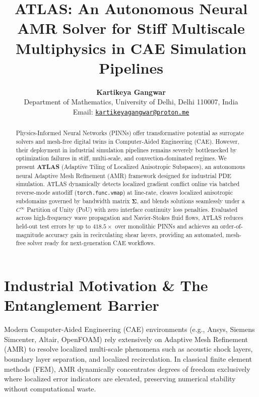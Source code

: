 \documentclass[10pt,a4paper,twocolumn]{article}
\title{\textbf{\Large ATLAS: An Autonomous Neural AMR Solver for Stiff Multiscale Multiphysics in CAE Simulation Pipelines}}
\author{
    \textbf{Kartikeya Gangwar} \\
    \small Department of Mathematics, University of Delhi, Delhi 110007, India \\
    \small Email: \href{mailto:kartikeyagangwar@proton.me}{\texttt{kartikeyagangwar@proton.me}}
}
\date{}
\begin{document}
\maketitle
\thispagestyle{empty}
\pagestyle{empty}

\begin{abstract}
\noindent Physics-Informed Neural Networks (PINNs) offer transformative potential as surrogate solvers and mesh-free digital twins in Computer-Aided Engineering (CAE). However, their deployment in industrial simulation pipelines remains severely bottlenecked by optimization failures in stiff, multi-scale, and convection-dominated regimes. We present \textbf{ATLAS} (Adaptive Tiling of Localized Anisotropic Subspaces), an autonomous neural Adaptive Mesh Refinement (AMR) framework designed for industrial PDE simulation. ATLAS dynamically detects localized gradient conflict online via batched reverse-mode autodiff (\texttt{torch.func.vmap}) at line-rate, cleaves localized anisotropic subdomains governed by bandwidth matrix $\boldsymbol{\Sigma}$, and blends solutions seamlessly under a $C^\infty$ Partition of Unity (PoU) with zero interface continuity loss penalties. Evaluated across high-frequency wave propagation and Navier-Stokes fluid flows, ATLAS reduces held-out test errors by up to $418.5\times$ over monolithic PINNs and achieves an order-of-magnitude accuracy gain in recirculating shear layers, providing an automated, mesh-free solver ready for next-generation CAE workflows.
\end{abstract}

\vspace{-0.2cm}
\section{Industrial Motivation \& The Entanglement Barrier}
Modern Computer-Aided Engineering (CAE) environments (e.g., Ansys, Siemens Simcenter, Altair, OpenFOAM) rely extensively on Adaptive Mesh Refinement (AMR) to resolve localized multi-scale phenomena such as acoustic shock layers, boundary layer separation, and localized recirculation. In classical finite element methods (FEM), AMR dynamically concentrates degrees of freedom exclusively where localized error indicators are elevated, preserving numerical stability without computational waste.
\end{document}
